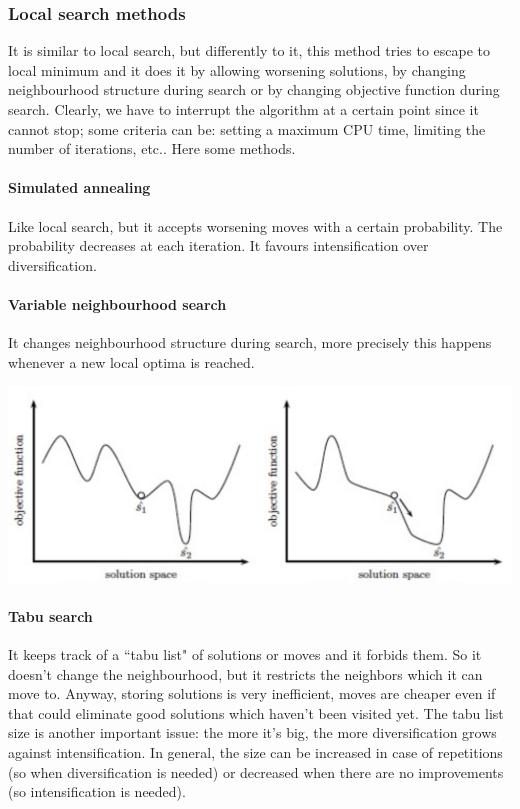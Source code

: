 \documentclass[10pt,a4paper]{article}
\begin{document}
\subsubsection{Local search methods}
It is similar to local search, but differently to it, this method tries to
escape to local minimum and it does it by allowing worsening solutions, by
changing neighbourhood structure during search or by changing objective function
during search. Clearly, we have to interrupt the algorithm at a certain point
since it cannot stop; some criteria can be: setting a maximum CPU time, limiting
the number of iterations, etc.. Here some methods.

\paragraph{Simulated annealing}
Like local search, but it accepts worsening moves with a certain probability.
The probability decreases at each iteration. It favours intensification over
diversification.

\paragraph{Variable neighbourhood search}
It changes neighbourhood structure during search, more precisely this happens
whenever a new local optima is reached.

\includegraphics[scale=0.2]{var-neigh-search.png}

\paragraph{Tabu search}
It keeps track of a ``tabu list" of solutions or moves and it forbids them. So
it doesn't change the neighbourhood, but it restricts the neighbors which it can
move to. Anyway, storing solutions is very inefficient, moves are cheaper even
if that could eliminate good solutions which haven't been visited yet. The tabu
list size is another important issue: the more it's big, the more
diversification grows against intensification. In general, the size can be
increased in case of repetitions (so when diversification is needed) or
decreased when there are no improvements (so intensification is needed).
\end{document}
